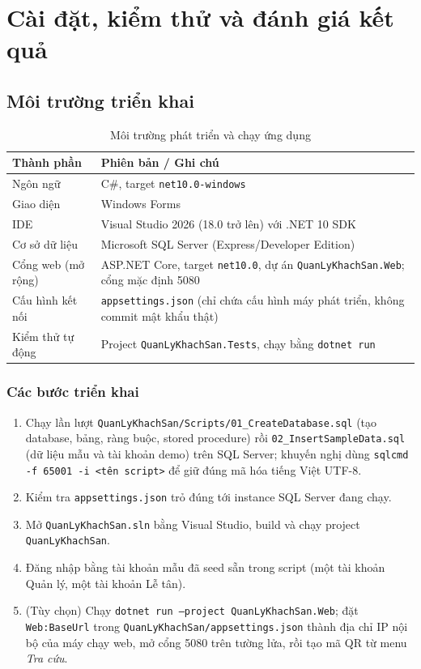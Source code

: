 \documentclass[14pt]{report}
\begin{document}
\chapter{Cài đặt, kiểm thử và đánh giá kết quả}

\section{Môi trường triển khai}

\begin{table}[H]
\centering
\caption{Môi trường phát triển và chạy ứng dụng}
\begin{tabularx}{\textwidth}{|l|X|}
\hline
\textbf{Thành phần} & \textbf{Phiên bản / Ghi chú} \\\hline
Ngôn ngữ & C\#, target \texttt{net10.0-windows} \\\hline
Giao diện & Windows Forms \\\hline
IDE & Visual Studio 2026 (18.0 trở lên) với .NET 10 SDK \\\hline
Cơ sở dữ liệu & Microsoft SQL Server (Express/Developer Edition) \\\hline
Cổng web (mở rộng) & ASP.NET Core, target \texttt{net10.0}, dự án \texttt{QuanLyKhachSan.Web}; cổng mặc định 5080 \\\hline
Cấu hình kết nối & \texttt{appsettings.json} (chỉ chứa cấu hình máy phát triển, không commit mật khẩu thật) \\\hline
Kiểm thử tự động & Project \texttt{QuanLyKhachSan.Tests}, chạy bằng \texttt{dotnet run} \\\hline
\end{tabularx}
\end{table}

\subsection{Các bước triển khai}

\begin{enumerate}
  \item Chạy lần lượt \texttt{QuanLyKhachSan/Scripts/01\_CreateDatabase.sql} (tạo database, bảng, ràng buộc, stored procedure) rồi \texttt{02\_InsertSampleData.sql} (dữ liệu mẫu và tài khoản demo) trên SQL Server; khuyến nghị dùng \texttt{sqlcmd -f 65001 -i <tên script>} để giữ đúng mã hóa tiếng Việt UTF-8.
  \item Kiểm tra \texttt{appsettings.json} trỏ đúng tới instance SQL Server đang chạy.
  \item Mở \texttt{QuanLyKhachSan.sln} bằng Visual Studio, build và chạy project \texttt{QuanLyKhachSan}.
  \item Đăng nhập bằng tài khoản mẫu đã seed sẵn trong script (một tài khoản Quản lý, một tài khoản Lễ tân).
  \item (Tùy chọn) Chạy \texttt{dotnet run --project QuanLyKhachSan.Web}; đặt \texttt{Web:BaseUrl} trong \texttt{QuanLyKhachSan/appsettings.json} thành địa chỉ IP nội bộ của máy chạy web, mở cổng 5080 trên tường lửa, rồi tạo mã QR từ menu \textit{Tra cứu}.
\end{enumerate}
\end{document}

